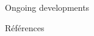 \documentclass[final, hyperref, table]{beamer}
\begin{document}
\begin{frame}[containsverbatim]{}
\begin{columns}[T]
\begin{column}[T]{.5\linewidth}
\begin{block}{Ongoing developments}
\begin{multicols}{2}[]
\begin{itemize}
\end{itemize}
\end{multicols}
\end{block}

\begin{block}{Références}\tiny

\vspace{-1cm}
\begin{multicols}{2}[]

\end{multicols}
\end{block}
  
\end{column}
\end{columns}
\end{frame}
\end{document}

